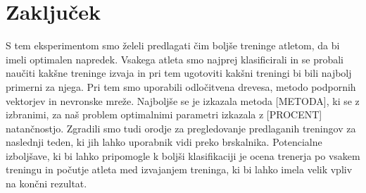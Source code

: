 \documentclass{acm_proc_article-sp}
\begin{document}
\section{Zaključek}
S tem eksperimentom smo želeli predlagati čim boljše treninge atletom, da bi imeli optimalen napredek.
Vsakega atleta smo najprej klasificirali in se probali naučiti kakšne treninge izvaja in pri tem ugotoviti kakšni treningi bi bili najbolj primerni za njega.
Pri tem smo uporabili odločitvena drevesa, metodo podpornih vektorjev in nevronske mreže.
Najboljše se je izkazala metoda [METODA], ki se z izbranimi, za naš problem optimalnimi parametri izkazala z [PROCENT] natančnostjo.
Zgradili smo tudi orodje za pregledovanje predlaganih treningov za naslednji teden, ki jih lahko uporabnik vidi preko brskalnika.
Potencialne izboljšave, ki bi lahko pripomogle k boljši klasifikaciji je ocena trenerja po vsakem treningu in počutje atleta med izvajanjem treninga, ki bi lahko imela velik vpliv na končni rezultat.

%

%
%

\balancecolumns
\end{document}
